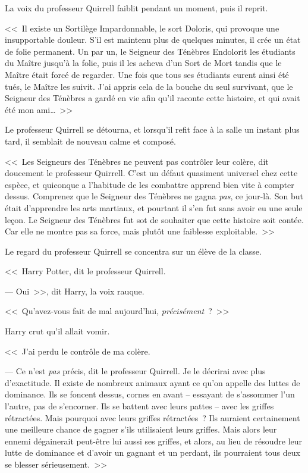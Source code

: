 La voix du professeur Quirrell faiblit pendant un moment, puis il reprit.

<<~Il existe un Sortilège Impardonnable, le sort Doloris, qui provoque une insupportable douleur. S'il est maintenu plus de quelques minutes, il crée un état de folie permanent. Un par un, le Seigneur des Ténèbres Endolorit les étudiants du Maître jusqu'à la folie, puis il les acheva d'un Sort de Mort tandis que le Maître était forcé de regarder. Une fois que tous ses étudiants eurent ainsi été tués, le Maître les suivit. J'ai appris cela de la bouche du seul survivant, que le Seigneur des Ténèbres a gardé en vie afin qu'il raconte cette histoire, et qui avait été mon ami…~>>

Le professeur Quirrell se détourna, et lorsqu'il refit face à la salle un instant plus tard, il semblait de nouveau calme et composé.

<<~Les Seigneurs des Ténèbres ne peuvent pas contrôler leur colère, dit doucement le professeur Quirrell. C'est un défaut quasiment universel chez cette espèce, et quiconque a l'habitude de les combattre apprend bien vite à compter dessus. Comprenez que le Seigneur des Ténèbres ne gagna \emph{pas}, ce jour-là. Son but était d'apprendre les arts martiaux, et pourtant il s'en fut sans avoir eu une seule leçon. Le Seigneur des Ténèbres fut sot de souhaiter que cette histoire soit contée. Car elle ne montre pas sa force, mais plutôt une faiblesse exploitable.~>>

Le regard du professeur Quirrell se concentra sur un élève de la classe.

<<~Harry Potter, dit le professeur Quirrell.

--- Oui~>>, dit Harry, la voix rauque.

<<~Qu'avez-vous fait de mal aujourd'hui, \emph{précisément}~?~>>

Harry crut qu'il allait vomir.

<<~J'ai perdu le contrôle de ma colère.

--- Ce n'est \emph{pas} précis, dit le professeur Quirrell. Je le décrirai avec plus d'exactitude. Il existe de nombreux animaux ayant ce qu'on appelle des luttes de dominance. Ils se foncent dessus, cornes en avant -- essayant de s'assommer l'un l'autre, pas de s'encorner. Ils se battent avec leurs pattes -- avec les griffes rétractées. Mais pourquoi avec leurs griffes rétractées~? Ils auraient certainement une meilleure chance de gagner s'ils utilisaient leurs griffes. Mais alors leur ennemi dégainerait peut-être lui aussi ses griffes, et alors, au lieu de résoudre leur lutte de dominance et d'avoir un gagnant et un perdant, ils pourraient tous deux se blesser sérieusement.~>>

